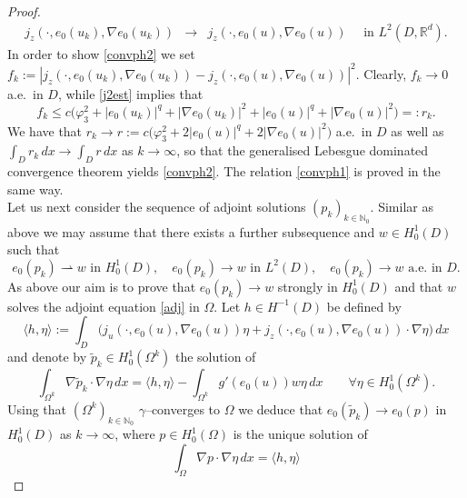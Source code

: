 \documentclass[a4paper,10pt]{article}
\newcommand{\dx}{\,dx}
\theoremstyle{plain}
\theoremstyle{plain}
\numberwithin{equation}{section}
\begin{document}
\begin{proof}
\begin{eqnarray}
j_z(\cdot,e_0(u_k),\nabla e_0(u_k)) & \rightarrow & j_z(\cdot,e_0(u), \nabla e_0(u)) \quad \mbox{ in } L^2(D,\mathbb R^d).\label{convph2}
\end{eqnarray}
In order to show \eqref{convph2} we set $f_k:=| j_z(\cdot,e_0(u_k),\nabla e_0(u_k)) - j_z(\cdot,e_0(u), \nabla e_0(u)) |^2$. Clearly, $f_k \rightarrow 0$ a.e.~in $D$, while
\eqref{j2est} implies that 
\begin{displaymath}
f_k \leq c \bigl( \varphi_3^2 + | e_0(u_k) |^q + | \nabla e_0(u_k) |^2 + | e_0(u) |^q + | \nabla e_0(u) |^2 \bigr)=: r_k.
\end{displaymath}
We have that $r_k \rightarrow r:=c \bigl( \varphi_3^2 + 2 | e_0(u) |^q + 2| \nabla e_0(u) |^2 \bigr)$ a.e.~in $D$ as well as $\int_D r_k \dx \rightarrow \int_D r \dx$ as $k
\rightarrow \infty$, so that the generalised Lebesgue dominated convergence theorem yields \eqref{convph2}.
The relation \eqref{convph1} is proved in the same way. \\
Let us next consider the sequence of adjoint solutions $(p_k)_{k \in \mathbb N_0}$. Similar as
above we may assume that there exists a further subsequence 
and $w \in H^1_0(D)$ such that
\begin{equation}\label{wcon}
e_0(p_k)  \rightharpoonup w \text{ in } H^1_0(D), \quad e_0(p_k)  \rightarrow w \text{ in } L^2(D), \quad 
e_0(p_k) \rightarrow w \text{ a.e. in } D.
\end{equation}
As above our  aim is to prove that $e_0(p_k) \rightarrow w$ strongly in $H^1_0(D)$ and that $w$ solves the adjoint equation \eqref{adj} in $\Omega$. Let
$h \in H^{-1}(D)$ be defined by
\begin{displaymath}
\langle h,\eta \rangle:= \int_{D} \bigl( j_u(\cdot,e_0(u),\nabla e_0(u)) \eta  + j_z(\cdot,e_0(u),\nabla e_0(u)) \cdot \nabla \eta \bigr)  \dx
\end{displaymath}
and denote by $\tilde p_k \in H^1_0(\Omega^k)$ the solution of
\begin{displaymath}
\int_{\Omega^k} \nabla \tilde p_k \cdot \nabla \eta  \dx  = \langle h,\eta \rangle
-  \int_{\Omega^k} g'(e_0(u)) w \eta \dx \qquad \forall \eta \in H^1_0(\Omega^k).
\end{displaymath}
Using that $(\Omega^k)_{k \in \mathbb N_0}$ $\gamma$--converges to $\Omega$ we deduce that $e_0(\tilde p_k) \rightarrow e_0(p)$ in $H^1_0(D)$ as $k \rightarrow \infty$,
where $p \in H^1_0(\Omega)$ is the unique solution of 
\begin{displaymath}
\int_\Omega \nabla p \cdot \nabla \eta  \dx = \langle h, \eta \rangle 

\end{displaymath}
\end{proof}
\end{document}
